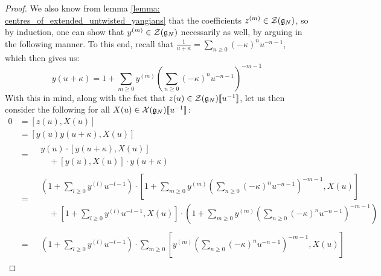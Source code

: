 \begin{proof}
                We also know from lemma \ref{lemma: centres_of_extended_untwisted_yangians} that the coefficients $z^{(m)} \in \calZ(\g_N)$, so by induction, one can show that $y^{(m)} \in \calZ(\g_N)$ necessarily as well, by arguing in the following manner. To this end, recall that $\frac{1}{u + \kappa} = \sum_{n \geq 0} (-\kappa)^n u^{-n - 1}$, which then gives us:
                    $$y(u + \kappa) = 1 + \sum_{m \geq 0} y^{(m)} \left( \sum_{n \geq 0} (-\kappa)^n u^{-n - 1} \right)^{-m - 1}$$
                With this in mind, along with the fact that $z(u) \in \calZ(\g_N)[\![u^{-1}]\!]$, let us then consider the following for all $X(u) \in \calX(\g_N)[\![u^{-1}]\!]$:
                    $$
                        \begin{aligned}
                            0 & = [z(u), X(u)]
                            \\
                            & = [y(u) y(u + \kappa), X(u)]
                            \\
                            & =
                            \begin{aligned}
                                & y(u) \cdot [y(u + \kappa), X(u)]
                                \\
                                & \quad + [y(u), X(u)] \cdot y(u + \kappa)
                            \end{aligned}
                            \\
                            & =
                            \begin{aligned}
                                & \left( 1 + \sum_{l \geq 0} y^{(l)} u^{-l - 1} \right) \cdot \left[ 1 + \sum_{m \geq 0} y^{(m)} \left( \sum_{n \geq 0} (-\kappa)^n u^{-n - 1} \right)^{-m - 1}, X(u) \right]
                                \\
                                & \quad + \left[ 1 + \sum_{l \geq 0} y^{(l)} u^{-l - 1}, X(u) \right] \cdot \left( 1 + \sum_{m \geq 0} y^{(m)} \left( \sum_{n \geq 0} (-\kappa)^n u^{-n - 1} \right)^{-m - 1} \right) 
                            \end{aligned}
                            \\
                            & =
                            \begin{aligned}
                                & \left( 1 + \sum_{l \geq 0} y^{(l)} u^{-l - 1} \right) \cdot \sum_{m \geq 0} \left[ y^{(m)} \left( \sum_{n \geq 0} (-\kappa)^n u^{-n - 1} \right)^{-m - 1}, X(u) \right]

\end{aligned}
\end{aligned}$$
\end{proof}
